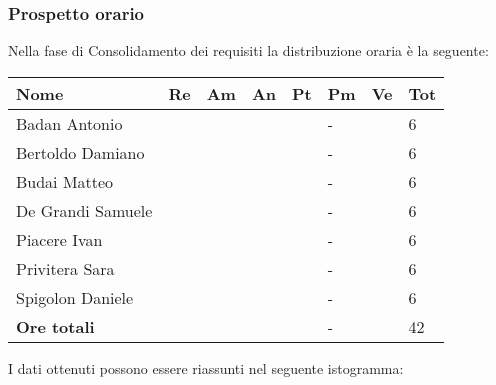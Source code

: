 \subsubsection{Prospetto orario}
Nella fase di Consolidamento dei requisiti la distribuzione oraria è la seguente:
\begin{center}
	\begin{longtable}{|p{}|p{}|p{}|p{}|p{}|p{}|p{}|p{}|}
		\hline
		\rowcolor{lighter-grayer}
		\centering\textbf{Nome} & \centering\textbf{Re} & \centering\textbf{Am} & \centering\textbf{An} &  \centering\textbf{Pt}&  \centering\textbf{Pm}&  \centering\textbf{Ve} & \textbf{Tot}\\
		\hline
		\endfirsthead
		
		\hline
		\centering Badan Antonio & \centering & \centering & \centering & \centering & \centering - & \centering & 6\\
		\hline
		\centering Bertoldo Damiano & \centering & \centering & \centering & \centering & \centering - & \centering & 6\\
		\hline
		\centering Budai Matteo & \centering & \centering & \centering & \centering & \centering - & \centering & 6\\
		\hline
		\centering De Grandi Samuele & \centering & \centering & \centering & \centering & \centering - & \centering & 6\\
		\hline
		\centering Piacere Ivan & \centering & \centering & \centering & \centering & \centering - & \centering & 6\\
		\hline
		\centering Privitera Sara & \centering & \centering & \centering & \centering & \centering - & \centering & 6\\
		\hline
		\centering Spigolon Daniele & \centering & \centering & \centering & \centering & \centering - & \centering & 6\\
		\hline
		\centering\textbf{Ore totali}  & \centering & \centering & \centering & \centering & \centering - & \centering & 42\\
		\hline
		
	\end{longtable}
\end{center}
I dati ottenuti possono essere riassunti nel seguente istogramma:
\\

